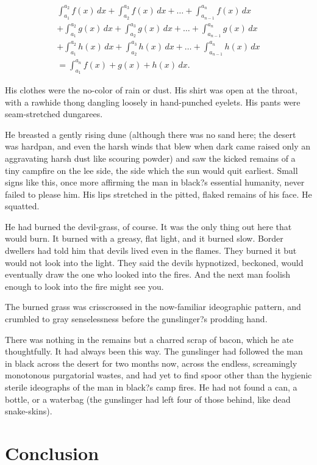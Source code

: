 \documentclass[
11pt,%
tightenlines,%
twoside,%
onecolumn,%
nofloats,%
nobibnotes,%
nofootinbib,%
superscriptaddress,%
noshowpacs,%
centertags]%
{revtex4}
\begin{document}
\begin{multline}
\int_{a_1}^{a_2} f(x)\,dx+\int_{a_2}^{a_3} f(x)\,dx
+\dots+\int_{a_{n-1}}^{a_n} f(x)\,dx\\
+\int_{a_1}^{a_2} g(x)\,dx+\int_{a_2}^{a_3} g(x)\,dx
+\dots+\int_{a_{n-1}}^{a_n} g(x)\,dx\\
+\int_{a_1}^{a_2} h(x)\,dx+\int_{a_2}^{a_3} h(x)\,dx
+\dots+\int_{a_{n-1}}^{a_n} h(x)\,dx\\
=\int_{a_1}^{a_n} f(x)+g(x)+h(x)\,dx.
\end{multline}

His clothes were the no-color of rain or dust. His shirt was open at the throat, with a rawhide thong dangling loosely in hand-punched eyelets. His pants were seam-stretched dungarees.

He breasted a gently rising dune (although there was no sand here; the desert was hardpan, and even the harsh winds that blew when dark came raised only an aggravating harsh dust like scouring powder) and saw the kicked remains of a tiny campfire on the lee side, the side which the sun would quit earliest. Small signs like this, once more affirming the man in black?s essential humanity, never failed to please him. His lips stretched in the pitted, flaked remains of his face. He squatted.

He had burned the devil-grass, of course. It was the only thing out here that would burn. It burned with a greasy, flat light, and it burned slow. Border dwellers had told him that devils lived even in the flames. They burned it but would not look into the light. They said the devils hypnotized, beckoned, would eventually draw the one who looked into the fires. And the next man foolish enough to look into the fire might see you.

The burned grass was crisscrossed in the now-familiar ideographic pattern, and crumbled to gray senselessness before the gunslinger?s prodding hand. 

There was nothing in the remains but a charred scrap of bacon, which he ate thoughtfully. It had always been this way. The gunslinger had followed the man in black across the desert for two months now, across the endless, screamingly monotonous purgatorial wastes, and had yet to find spoor other than the hygienic sterile ideographs of the man in black?s camp fires. He had not found a can, a bottle, or a waterbag (the gunslinger had left four of those behind, like dead snake-skins).

\section{Conclusion}
\end{document}
